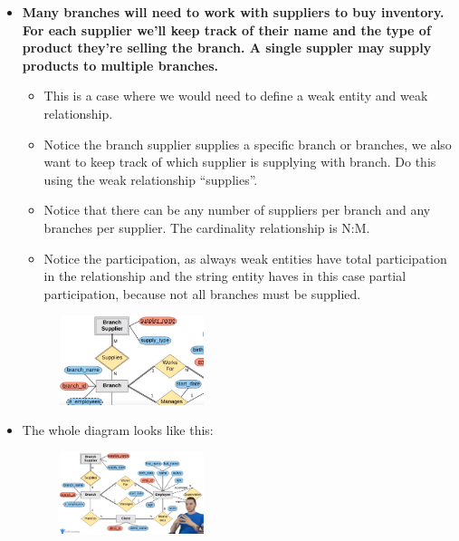 \begin{itemize}
    \item \textbf{Many branches will need to work with suppliers to buy inventory. For each supplier we'll keep track of their name and the type of product they're selling the branch. A single suppler may supply products to multiple branches.}
        \begin{itemize}
            \item This is a case where we would need to define a weak entity and weak relationship.
            \item Notice the branch supplier supplies a specific branch or branches, we also want to keep track of which supplier is supplying with branch. Do this using the weak relationship ``supplies''.
            \item Notice that there can be any number of suppliers per branch and any branches per supplier. The cardinality relationship is N:M.
            \item Notice the participation, as always weak entities have total participation in the relationship and the string entity haves in this case partial participation, because not all branches must be supplied. 
        \end{itemize}
        \begin{figure}[H]
            \centering
            \includegraphics[width=0.4\textwidth]{./Figs/2020-12-24-00-48-35.png}
        \end{figure}
    
    \item The whole diagram looks like this:
        \begin{figure}[H]
            \centering
            \includegraphics[width=0.4\textwidth]{./Figs/2020-12-24-00-50-11.png}
        \end{figure}
\end{itemize}

